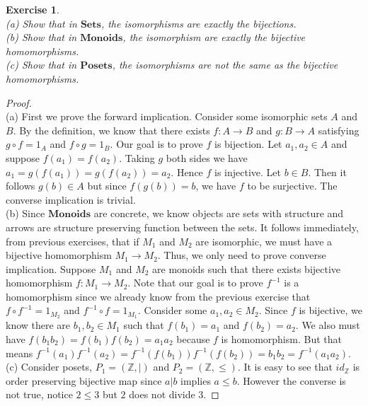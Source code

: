 \documentclass[a4paper, 11pt]{book}
\theoremstyle{plain}
\newtheorem{exercise}{Exercise}[chapter]
\theoremstyle{plain}
\newcommand{\mb}{\mathbf}
\newcommand{\arr}{\rightarrow}
\newcommand{\inv}{{-1}}
\newcommand{\Z}{\mathbb{Z}}
\begin{document}
  \begin{exercise} $ $ \\
    (a) Show that in $\mb{Sets}$, the isomorphisms are exactly the bijections. \\
    (b) Show that in $\mb{Monoids}$, the isomorphism are exactly the bijective homomorphisms. \\
    (c) Show that in $\mb{Posets}$, the isomorphisms are not the same as the bijective homomorphisms.
  \end{exercise}
  \begin{proof} $ $ \\
    (a) First we prove the forward implication. Consider some isomorphic sets $A$ and $B$. By the definition, we know that there exists $f:A \arr B$ and $g:B \arr A$ satisfying $g \circ f =1_A$ and $f \circ g=1_B$. Our goal is to prove $f$ is bijection. Let $a_1,a_2 \in A$ and suppose $f(a_1)=f(a_2)$. Taking $g$ both sides we have $a_1=g(f(a_1))=g(f(a_2))=a_2$. Hence $f$ is injective. Let $b \in B$. Then it follows $g(b) \in A$ but since $f(g(b))=b$, we have $f$ to be surjective. The converse implication is trivial. \\

    (b) Since $\mb{Monoids}$ are concrete, we know objects are sets with structure and arrows are structure preserving function between the sets. It follows immediately, from previous exercises, that if $M_1$ and $M_2$ are isomorphic, we must have a bijective homomorphism $M_1 \arr M_2$. Thus, we only need to prove converse implication. Suppose $M_1$ and $M_2$ are monoids such that there exists bijective homomorphism $f:M_1 \arr M_2$. Note that our goal is to prove $f^{-1}$ is a homomorphism since we already know from the previous exercise that $f \circ f^{-1}=1_{M_2}$ and $f^{-1} \circ f=1_{M_1}$. Consider some $a_1, a_2 \in M_2$. Since $f$ is bijective, we know there are $b_1,b_2 \in M_1$ such that $f(b_1)=a_1$ and $f(b_2)=a_2$. We also must have $f(b_1b_2)=f(b_1)f(b_2)=a_1a_2$ because $f$ is homomorphism. But that means $f^\inv(a_1)f^\inv (a_2)=f^\inv (f(b_1))f^\inv (f(b_2))=b_1b_2=f^\inv(a_1a_2)$. \\

    (c) Consider posets, $P_1=(\Z, |)$ and $P_2=(\Z, \leq)$. It is easy to see that $id_{\Z}$ is order preserving bijective map since $a|b$ implies $a \leq b$. However the converse is not true, notice $2 \leq 3$ but $2$ does not divide $3$.
  \end{proof}
\end{document}

